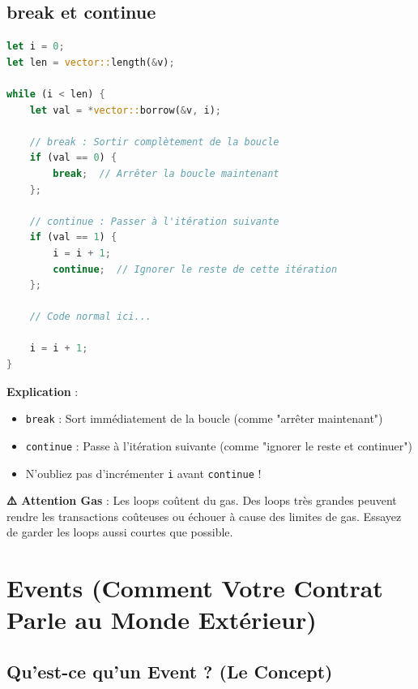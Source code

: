 \documentclass[11pt]{article}
\begin{document}
\subsection{break et continue}

\begin{lstlisting}[language=Rust, caption=Utilisation de break et continue]
let i = 0;
let len = vector::length(&v);

while (i < len) {
    let val = *vector::borrow(&v, i);
    
    // break : Sortir complètement de la boucle
    if (val == 0) {
        break;  // Arrêter la boucle maintenant
    };
    
    // continue : Passer à l'itération suivante
    if (val == 1) {
        i = i + 1;
        continue;  // Ignorer le reste de cette itération
    };
    
    // Code normal ici...
    
    i = i + 1;
}
\end{lstlisting}

\begin{noteBox}
\textbf{Explication} :
\begin{itemize}
  \item \texttt{break} : Sort immédiatement de la boucle (comme "arrêter maintenant")
  \item \texttt{continue} : Passe à l'itération suivante (comme "ignorer le reste et continuer")
  \item N'oubliez pas d'incrémenter \texttt{i} avant \texttt{continue} !
\end{itemize}
\end{noteBox}

\begin{warnBox}
\textbf{⚠️ Attention Gas} : Les loops coûtent du gas. Des loops très grandes peuvent rendre les transactions coûteuses ou échouer à cause des limites de gas. Essayez de garder les loops aussi courtes que possible.
\end{warnBox}

\section{Events (Comment Votre Contrat Parle au Monde Extérieur)}

\subsection{Qu'est-ce qu'un Event ? (Le Concept)}
\end{document}
